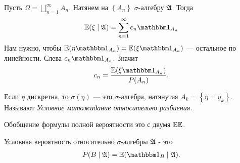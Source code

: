 \documentclass[../main.tex]{subfiles}
\begin{document}
\begin{exmpl}
 Пусть $ \Omega = \bigsqcup_{n=1}^{\infty} A_n $. Натянем на $ \left\{A_n \right\} $ $ \sigma $-алгебру $ \mathfrak A $. Тогда
 \begin{align*}
  \E(\xi \mid \A) = \sum_{n=1}^{\infty} c_n \Ind_{A_n}
 \end{align*} Нам нужно, чтобы $ \E(\eta\Ind_{A_n}) = \E(\xi\Ind_{A_n}) $ --- остальное по линейности. Слева $ c_n \Ind_{A_n} $. Значит
 \begin{align*}
  c_n = \frac{\E(\xi \Ind_{A_n})}{P(A_n)}.
 \end{align*}
\end{exmpl}

Если $ \eta $ дискретна, то $ \sigma(\eta) $ --- это $ \sigma $-алгебра, натянутая $ A_k = \left\{ \eta = y_k \right\} $. Называют \textit{Условное матожидание относительно разбиения.}

Обобщение формулы полной вероятности это с двумя $ \mathbb E\mathbb E $.

\begin{df}
 Условная вероятность относительно $ \sigma $-алгебры $ \mathfrak A $ - это
 \begin{align*}
  P(B \mid \A) = \E(\Ind_B \mid \A).
 \end{align*}
\end{df}
\end{document}

